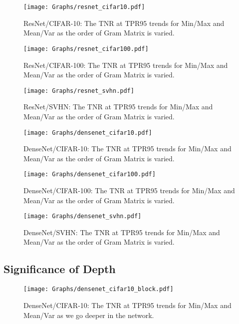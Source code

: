 \documentclass{article}
\begin{document}
\begin{figure}[H]
    \hspace{-1.5in}
    \texttt{[image: Graphs/resnet\_cifar10.pdf]}
    \caption{ResNet/CIFAR-10: The TNR at TPR95 trends for Min/Max and Mean/Var as the order of Gram Matrix is varied.}
    \label{fig:power_start}
\end{figure}

\begin{figure}[H]
    \hspace{-1.5in}
    \texttt{[image: Graphs/resnet\_cifar100.pdf]}
    \caption{ResNet/CIFAR-100: The TNR at TPR95 trends for Min/Max and Mean/Var as the order of Gram Matrix is varied.}
\end{figure}

\begin{figure}[H]
    \hspace{-1.5in}
    \texttt{[image: Graphs/resnet\_svhn.pdf]}
    \caption{ResNet/SVHN: The TNR at TPR95 trends for Min/Max and Mean/Var as the order of Gram Matrix is varied.}
\end{figure}

\begin{figure}[H]
    \hspace{-1.5in}
    \texttt{[image: Graphs/densenet\_cifar10.pdf]}
    \caption{DenseNet/CIFAR-10: The TNR at TPR95 trends for Min/Max and Mean/Var as the order of Gram Matrix is varied.}
\end{figure}

\begin{figure}[H]
    \hspace{-1.5in}
    \texttt{[image: Graphs/densenet\_cifar100.pdf]}
    \caption{DenseNet/CIFAR-100: The TNR at TPR95 trends for Min/Max and Mean/Var as the order of Gram Matrix is varied.}
\end{figure}

\begin{figure}[H]
    \hspace{-1.5in}
    \texttt{[image: Graphs/densenet\_svhn.pdf]}
    \caption{DenseNet/SVHN: The TNR at TPR95 trends for Min/Max and Mean/Var as the order of Gram Matrix is varied.}
    \label{fig:power_end}
\end{figure}

\subsection{Significance of Depth}
\label{appendix:depth_graphs}
\begin{figure}[H]
    \hspace{-1.5in}
    \texttt{[image: Graphs/densenet\_cifar10\_block.pdf]}
    \caption{DenseNet/CIFAR-10: The TNR at TPR95 trends for Min/Max and Mean/Var as we go deeper in the network.}
\end{figure}
\end{document}
